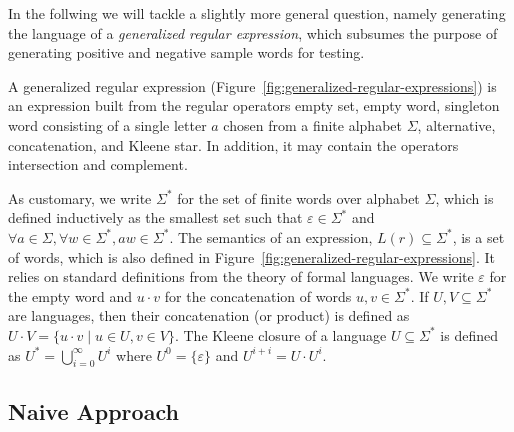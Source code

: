 In the follwing we will tackle a slightly more general question, namely generating
the language of a \emph{generalized regular expression}, 
which subsumes the purpose of generating positive and negative sample
words for testing.

A generalized regular expression
(Figure~\ref{fig:generalized-regular-expressions}) is an expression
built from the regular operators empty set, empty word, singleton word
consisting of a single letter $a$ chosen from a finite alphabet
$\Sigma$, alternative, concatenation, and Kleene star. In addition, it
may contain the operators intersection and complement.

As customary, we write $\Sigma^*$ for the set of finite words over
alphabet $\Sigma$, which is defined inductively as the smallest set
such that $\varepsilon \in
\Sigma^*$ and $\forall a\in\Sigma, \forall w\in\Sigma^*, aw \in \Sigma^*$.
The semantics of an expression, $L(r) \subseteq \Sigma^*$, is a set of
words, which is also defined in
Figure~\ref{fig:generalized-regular-expressions}. It relies on
standard definitions from the theory of formal languages. We write
$\varepsilon$ for the empty word and $u\cdot v$ for the concatenation
of words $u, v \in \Sigma^*$. If $U, V \subseteq \Sigma^*$ are
languages, then their concatenation (or product) is defined as $U\cdot
V = \{ u\cdot v \mid u\in U, v\in V\}$. The Kleene closure of a
language $U\subseteq \Sigma^*$ is defined as $U^* =
\bigcup_{i=0}^\infty U^i$ where $U^0 = \{\varepsilon\}$ and $U^{i+i} =
U \cdot U^i$. 

\subsection{Naive Approach}
\label{sec:naive-approach}

